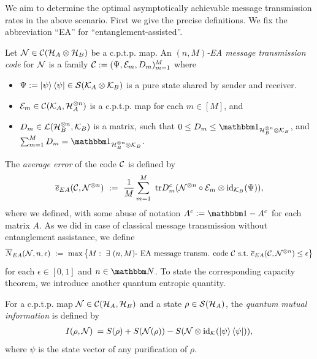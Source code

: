 We aim to determine the optimal asymptotically achievable message transmission rates in the above scenario. First we give the precise definitions. We fix the abbreviation ``EA'' for ``entanglement-assisted''.
\begin{definition}\label{def:ea_cl_mes_code}
Let ${\mathcal N} \in {\mathcal C}({\mathcal H}_A \otimes {\mathcal H}_B)$ be a c.p.t.p. map. An \emph{$(n,M)$-EA message transmission code} for ${\mathcal N}$ is a family ${\mathcal C} := (\Psi, {\mathcal E}_m, D_m)_{m=1}^M$ where
\begin{itemize}
 \item $\Psi := \ket{\psi}\bra{\psi} \in {\mathcal S}({\mathcal K}_A \otimes {\mathcal K}_B)$ is a pure state shared by sender and receiver. 
 \item ${\mathcal E}_m \in {\mathcal C}({\mathcal K}_A, {\mathcal H}_A^{\otimes n})$ is a c.p.t.p. map for each $m \in [M]$, and
 \item $D_m \in {\mathcal L}({\mathcal H}_B^{\otimes n}, {\mathcal K}_B)$ is a matrix, such that $0 \leq D_m \leq \bbmeins_{\cH_B^{\otimes n} \otimes \cK_B}$, and $\sum_{m=1}^M D_m = \bbmeins_{\cH_B^{\otimes n} \otimes \cK_B}$.
\end{itemize}
\end{definition}
The \emph{average error} of the code ${\mathcal C}$ is defined by 
\begin{align}
 \overline{e}_{EA}({\mathcal C}, {\mathcal N}^{\otimes n}) \ := \ \frac{1}{M} \sum_{m=1}^M \ \mathrm{tr} D_m^c({\mathcal N}^{\otimes n} \circ {\mathcal E}_m \otimes \mathrm{id}_{{\mathcal K}_B}(\Psi)),
\end{align}
where we defined, with some abuse of notation $A^c := \bbmeins - A^c$ for each matrix $A$. As we did in case of classical message transmission without entanglement assistance, we define 
\begin{align*}
\overline{N}_{EA}(\cN, n , \epsilon) \ := \ \max\left\{M: \ \exists \ (n,M) \text{- EA message transm. code} \ \cC \ \text{s.t.} \ \overline{e}_{EA}(\cC, \cN^{\otimes n}) \leq \epsilon \right\} 
\end{align*}
for each $\epsilon \in [0,1]$ and $n \in \bbmN$. To state the corresponding capacity theorem, we introduce another quantum entropic quantity. 
\begin{definition} 
For a c.p.t.p. map ${\mathcal N} \in {\mathcal C}({\mathcal H}_A, {\mathcal H}_B)$ and a state $\rho \in {\mathcal S}({\mathcal H}_A)$, the \emph{quantum mutual information}  is defined by
\begin{align}
 I(\rho,{\mathcal N}) \:= S(\rho) + S({\mathcal N}(\rho)) - S({\mathcal N} \otimes \mathrm{id}_{{\mathcal K}}(\ket{\psi}\bra{\psi})), \label{def:qmi_q}
\end{align}
where $\psi$ is the state vector of any purification of $\rho$. 
\end{definition}
